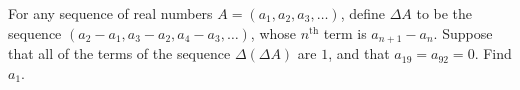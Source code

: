 For any sequence of real numbers $A=(a_1,a_2,a_3,\ldots)$, define $\Delta A$ to be the sequence $(a_2-a_1,a_3-a_2,a_4-a_3,\ldots)$, whose $n^\text{th}$ term is $a_{n+1}-a_n$. Suppose that all of the terms of the sequence $\Delta(\Delta A)$ are $1$, and that $a_{19}=a_{92}=0$. Find $a_1$.